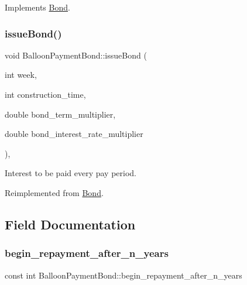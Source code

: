 Implements \mbox{\hyperlink{classBond_a5997278813deb16aa5d01bbca8ecc7b2_a5997278813deb16aa5d01bbca8ecc7b2}{Bond}}.

\mbox{\label{classBalloonPaymentBond_af22552acd74b08dbb1d308cc5e45344c_af22552acd74b08dbb1d308cc5e45344c}} 
\subsubsection{\texorpdfstring{issue\+Bond()}{issueBond()}}
{\footnotesize\ttfamily void Balloon\+Payment\+Bond\+::issue\+Bond (\begin{DoxyParamCaption}\item[{int}]{week,  }\item[{int}]{construction\+\_\+time,  }\item[{double}]{bond\+\_\+term\+\_\+multiplier,  }\item[{double}]{bond\+\_\+interest\+\_\+rate\+\_\+multiplier }\end{DoxyParamCaption})\hspace{0.3cm}{\ttfamily [override]}, {\ttfamily [virtual]}}

Interest to be paid every pay period. 

Reimplemented from \mbox{\hyperlink{classBond_a377db8c18b83c4666e46686bc26adef1_a377db8c18b83c4666e46686bc26adef1}{Bond}}.



\subsection{Field Documentation}
\mbox{\label{classBalloonPaymentBond_a7e1e064643021755eda4873b0c98e434_a7e1e064643021755eda4873b0c98e434}} 
\subsubsection{\texorpdfstring{begin\+\_\+repayment\+\_\+after\+\_\+n\+\_\+years}{begin\_repayment\_after\_n\_years}}
{\footnotesize\ttfamily const int Balloon\+Payment\+Bond\+::begin\+\_\+repayment\+\_\+after\+\_\+n\+\_\+years\hspace{0.3cm}{\ttfamily [private]}}

